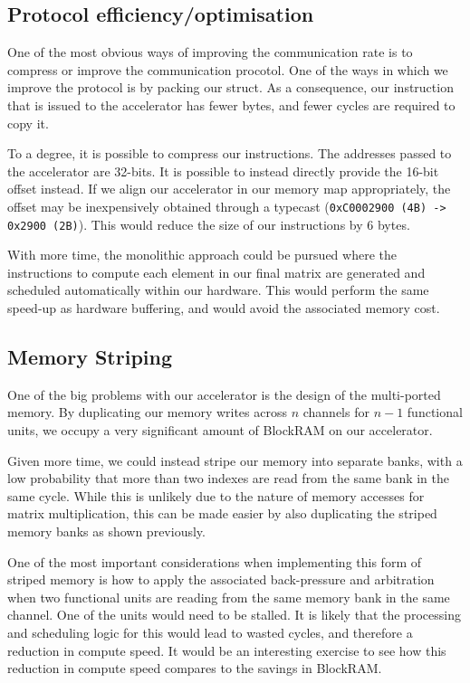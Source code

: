 \documentclass[a4paper,8pt]{report}
\begin{document}
\subsection{Protocol efficiency/optimisation}
One of the most obvious ways of improving the communication rate is to compress
or improve the communication procotol. One of the ways in which we improve the
protocol is by packing our struct. As a consequence, our instruction that is
issued to the accelerator has fewer bytes, and fewer cycles are required to copy it.

To a degree, it is possible to compress our instructions. The addresses passed
to the accelerator are 32-bits. It is possible to instead directly provide the
16-bit offset instead. If we align our accelerator in our memory map
appropriately, the offset may be inexpensively obtained through a typecast
(\texttt{0xC0002900 (4B) -> 0x2900 (2B)}). This would reduce the size of our
instructions by 6 bytes.

With more time, the monolithic approach could be pursued where the
instructions to compute each element in our final matrix are generated and
scheduled automatically within our hardware. This would perform the same
speed-up as hardware buffering, and would avoid the associated memory cost.

\subsection{Memory Striping}
One of the big problems with our accelerator is the design of the multi-ported
memory. By duplicating our memory writes across $n$ channels for $n-1$
functional units, we occupy a very significant amount of BlockRAM on our
accelerator.

Given more time, we could instead stripe our memory into separate banks, with a
low probability that more than two indexes are read from the same bank in the
same cycle. While this is unlikely due to the nature of memory accesses for matrix
multiplication, this can be made easier by also duplicating the striped memory
banks as shown previously.

One of the most important considerations when implementing this form of striped
memory is how to apply the associated back-pressure and arbitration when two functional units
are reading from the same memory bank in the same channel. One of the units
would need to be stalled. It is likely that the processing and scheduling logic
for this would lead to wasted cycles, and therefore a reduction in compute
speed. It would be an interesting exercise to see how this reduction in compute
speed compares to the savings in BlockRAM.
\end{document}
